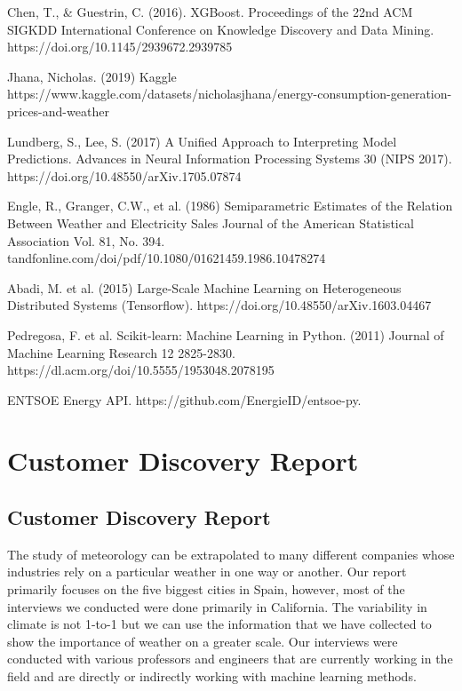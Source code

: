 \documentclass[10pt]{article}
\begin{document}
\newpage
\begin{thebibliography}{9} 
    
	 Chen, T., \& Guestrin, C. (2016). XGBoost. Proceedings of the 22nd ACM SIGKDD International Conference on Knowledge Discovery and Data Mining. https://doi.org/10.1145/2939672.2939785 
	
	 Jhana, Nicholas. (2019) Kaggle https://www.kaggle.com/datasets/nicholasjhana/energy-consumption-generation-prices-and-weather
	
	 Lundberg, S., Lee, S. (2017) A Unified Approach to Interpreting Model Predictions. Advances in Neural Information Processing Systems 30 (NIPS 2017). https://doi.org/10.48550/arXiv.1705.07874
	
	 Engle, R., Granger, C.W., et al. (1986) Semiparametric Estimates of the Relation Between Weather and Electricity Sales Journal of the American Statistical Association Vol. 81, No. 394. tandfonline.com/doi/pdf/10.1080/01621459.1986.10478274
	
	 Abadi, M. et al. (2015) Large-Scale Machine Learning on Heterogeneous Distributed Systems (Tensorflow).
	https://doi.org/10.48550/arXiv.1603.04467
	
	 Pedregosa, F. et al. Scikit-learn: Machine Learning in Python. (2011) Journal of Machine Learning Research 12 2825-2830.
	https://dl.acm.org/doi/10.5555/1953048.2078195
	
	 ENTSOE Energy API.  https://github.com/EnergieID/entsoe-py.
	
	
	
	
	
\end{thebibliography}

\newpage
\section{Customer Discovery Report}\label{sec:7}
\subsection*{Customer Discovery Report}
The study of meteorology can be extrapolated to many different companies whose industries rely on a particular weather in one way or another. Our report primarily focuses on the five biggest cities in Spain, however, most of the interviews we conducted were done primarily in California. The variability in climate is not 1-to-1 but we can use the information that we have collected to show the importance of weather on a greater scale. Our interviews were conducted with various professors and engineers that are currently working in the field and are directly or indirectly working with machine learning methods. 
\end{document}
